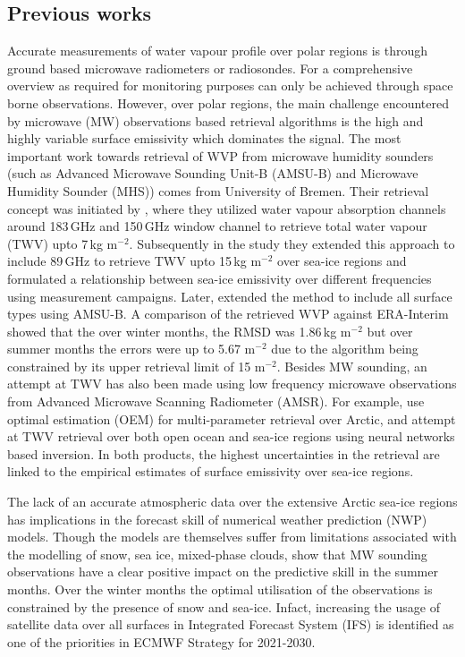 \documentclass[12pt,oneside,a4paper]{article}
\begin{document}
\subsection{Previous works}
%
\label{sec:previousworks}
Accurate measurements of water vapour profile over polar regions is through ground based microwave radiometers or radiosondes. For a comprehensive overview as required for monitoring purposes can only be achieved through space borne observations. However, over polar regions, the main challenge encountered by microwave (MW) observations based retrieval algorithms is the high and highly variable surface emissivity which dominates the signal. The most important work towards retrieval of WVP from microwave humidity sounders (such as Advanced Microwave Sounding Unit-B (AMSU-B) and Microwave Humidity Sounder (MHS)) comes from University of Bremen. Their retrieval concept was initiated by \citet{miao:2001:atmos}, where they utilized water vapour absorption channels around 183\,GHz and  150\,GHz window channel to retrieve total water vapour (TWV) upto 7\,kg m$^{-2}$. Subsequently in the study \citep{} they extended this approach to include 89\,GHz to retrieve TWV upto 15\,kg m$^{-2}$ over sea-ice regions and formulated a relationship between sea-ice emissivity over different frequencies using measurement campaigns. Later, \cite{scarlat:2018:retri} extended the method to include all surface types using AMSU-B. A comparison of the retrieved WVP against ERA-Interim showed that the over winter months, the RMSD was  1.86\,kg m$^{-2}$ but over summer months the errors were up to 5.67 m$^{-2}$ due to the algorithm being constrained by its upper retrieval limit of 15 m$^{-2}$. Besides MW sounding, an attempt at TWV has also been made using low frequency microwave observations from Advanced Microwave Scanning Radiometer (AMSR). For example, \citet{scarlat:2017:exper} use optimal estimation (OEM) for multi-parameter retrieval over Arctic, and \citet{zabolotskikh:2020:anadv} attempt at TWV retrieval over both open ocean and sea-ice regions using neural networks based inversion. In both products, the highest uncertainties in the retrieval are linked to the empirical estimates of surface emissivity over sea-ice regions.


The lack of an accurate atmospheric data over the extensive Arctic sea-ice regions has implications in the forecast skill of numerical weather prediction (NWP) models. Though the  models are themselves suffer from limitations associated with the modelling of snow, sea ice, mixed-phase clouds, \citet{lawrence:2019:usean} show that MW sounding observations have a clear positive impact on the predictive skill in the summer months. Over the winter months the optimal utilisation of the observations is constrained by the presence of snow and sea-ice. Infact,  increasing the usage of satellite data over all surfaces in Integrated Forecast System (IFS) is identified as one of the priorities in ECMWF Strategy for 2021-2030. 
\end{document}
